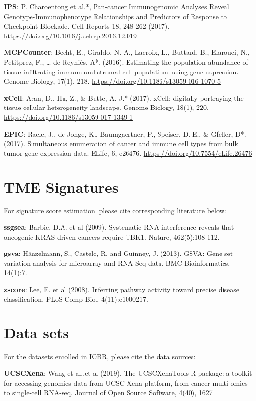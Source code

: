 \documentclass[
  12pt,
]{book}
\theoremstyle{definition}
\theoremstyle{definition}
\theoremstyle{definition}
\theoremstyle{definition}
\theoremstyle{remark}
\begin{document}
\textbf{IPS}: P. Charoentong et al.*, Pan-cancer Immunogenomic Analyses Reveal Genotype-Immunophenotype Relationships and Predictors of Response to Checkpoint Blockade. Cell Reports 18, 248-262 (2017). \url{https://doi.org/10.1016/j.celrep.2016.12.019}

\textbf{MCPCounter}: Becht, E., Giraldo, N. A., Lacroix, L., Buttard, B., Elarouci, N., Petitprez, F., \ldots{} de Reyniès, A*. (2016). Estimating the population abundance of tissue-infiltrating immune and stromal cell populations using gene expression. Genome Biology, 17(1), 218. \url{https://doi.org/10.1186/s13059-016-1070-5}

\textbf{xCell}: Aran, D., Hu, Z., \& Butte, A. J.* (2017). xCell: digitally portraying the tissue cellular heterogeneity landscape. Genome Biology, 18(1), 220. \url{https://doi.org/10.1186/s13059-017-1349-1}

\textbf{EPIC}: Racle, J., de Jonge, K., Baumgaertner, P., Speiser, D. E., \& Gfeller, D*. (2017). Simultaneous enumeration of cancer and immune cell types from bulk tumor gene expression data. ELife, 6, e26476. \url{https://doi.org/10.7554/eLife.26476}

\hypertarget{tme-signatures}{%
\section{TME Signatures}\label{tme-signatures}}

For signature score estimation, please cite corresponding literature below:

\textbf{ssgsea}: Barbie, D.A. et al (2009). Systematic RNA interference reveals that oncogenic KRAS-driven cancers require TBK1. Nature, 462(5):108-112.

\textbf{gsva}: Hänzelmann, S., Castelo, R. and Guinney, J. (2013). GSVA: Gene set variation analysis for microarray and RNA-Seq data. BMC Bioinformatics, 14(1):7.

\textbf{zscore}: Lee, E. et al (2008). Inferring pathway activity toward precise disease classification. PLoS Comp Biol, 4(11):e1000217.

\hypertarget{data-sets}{%
\section{Data sets}\label{data-sets}}

For the datasets enrolled in IOBR, please cite the data sources:

\textbf{UCSCXena}: Wang et al.,et al (2019). The UCSCXenaTools R package: a toolkit for accessing genomics data from UCSC Xena platform, from cancer multi-omics to single-cell RNA-seq. Journal of Open Source Software, 4(40), 1627
\end{document}
